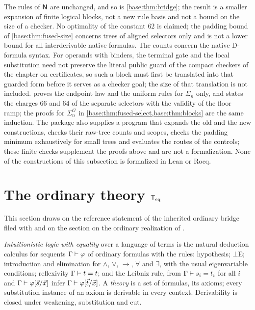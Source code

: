 \begin{remark}
\label{base:rem:blocks}
The rules of $\mathsf{N}$ are unchanged, and so is \cref{base:thm:bridge}; the
result is a smaller expansion of finite logical blocks, not a new rule
basis and not a bound on the size of a checker.  No optimality of the
constant $62$ is claimed; the padding bound of \cref{base:thm:fused-size}
concerns trees of aligned selectors only and is not a lower bound for all
interderivable native formulas.  The counts concern the native D-formula
syntax.  For operands with binders, the terminal gate and the local
substitution need not preserve the literal public guard of the compact
checkers of the chapter on certificates, so such a block must first be
translated into that guarded form before it serves as a checker goal; the
size of that translation is not included.  
proves the endpoint law and the uniform rules for $\Sigma_n$ only, and states
the charges $66$ and $64$ of the separate selectors with the validity of the
floor ramp; the proofs for $\Sigma^{G}_n$ in
\cref{base:thm:fused-select,base:thm:blocks} are the same induction.
The package also supplies a program that expands the old and the new
constructions, checks their raw-tree counts and scopes, checks the padding
minimum exhaustively for small trees and evaluates the routes of the
controls; these finite checks supplement the proofs above and are not a
formalization.  None of the constructions of this subsection is formalized
in Lean or Rocq.
\end{remark}

\section{The ordinary theory \texorpdfstring{$\mathsf{T}_{\mathrm{eq}}$}{Teq}}
\label{base:sec:teq}

This section draws on the reference statement of the inherited ordinary
bridge filed with  and on the section on the ordinary
realization of .

\begin{definition}
\label{base:def:logic}
\emph{Intuitionistic logic with equality} over a language of terms is the
natural deduction calculus for sequents $\Gamma\vdash\varphi$ of ordinary
formulas with the rules: hypothesis; $\bot$E; introduction and elimination
for $\wedge$, $\vee$, $\to$, $\forall$ and $\exists$, with the usual
eigenvariable conditions; reflexivity $\Gamma\vdash t=t$; and the Leibniz
rule, from $\Gamma\vdash s_i=t_i$ for all $i$ and
$\Gamma\vdash\varphi[\vec s/\vec x]$ infer
$\Gamma\vdash\varphi[\vec t/\vec x]$.  A \emph{theory} is a set of
formulas, its axioms; every substitution instance of an axiom is derivable
in every context.  Derivability is closed under weakening, substitution and
cut.
\end{definition}

